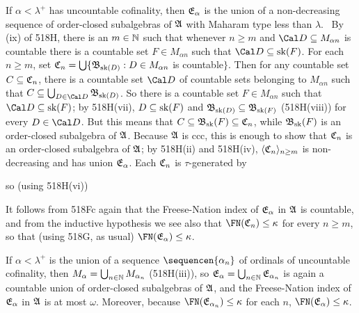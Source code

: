 { If $\alpha<\lambda^+$ has uncountable cofinality, then
$\frak E_{\alpha}$ is the union of a non-decreasing sequence of order-closed
subalgebras of $\frak A$ with Maharam type less than $\lambda$.   \Prf\ By
(ix) of 518H,
there is an $m\in\Bbb N$ such that whenever $n\ge m$ and
$\Cal D\subseteq M_{\alpha n}$ is countable there is a countable set
$F\in M_{\alpha n}$ such that $\Cal D\subseteq\sk(F)$.   For each $n\ge m$,
set
$\frak C_n=\bigcup\{\frak B_{\mathop{\text{sk}}(D)}:D\in M_{\alpha n}$ is countable$\}$.
Then for any countable set $C\subseteq\frak C_n$, there is a countable
set $\Cal D$ of countable sets belonging to $M_{\alpha n}$ such that
$C\subseteq\bigcup_{D\in\Cal D}\frak B_{\sk(D)}$.   So there is a
countable set $F\in M_{\alpha n}$ such that $\Cal D\subseteq\sk(F)$;  by
518H(vii), $D\subseteq\mathop{\text{sk}}(F)$ and
$\frak B_{\mathop{\text{sk}}(D)}\subseteq\frak B_{\mathop{\text{sk}}(F)}$ (518H(viii))
for every $D\in\Cal D$.
But this means that $C\subseteq\frak B_{\mathop{\text{sk}}}(F)\subseteq\frak C_n$,
while $\frak B_{\mathop{\text{sk}}}(F)$ is an order-closed subalgebra of $\frak A$.
Because $\frak A$ is ccc, this is enough to show that $\frak C_n$ is an
order-closed subalgebra of $\frak A$;  by 518H(ii) and 518H(iv),
$\langle\frak C_n\rangle_{n\ge m}$ is non-decreasing and has union
$\frak E_{\alpha}$.   Each $\frak C_n$ is $\tau$-generated by


\noindent so (using 518H(vi))


It follows from 518Fc again that the Freese-Nation index of $\frak E_{\alpha}$ in
$\frak A$ is countable, and from the inductive hypothesis we see also
that $\FN(\frak C_n)\le\kappa$ for every $n\ge m$,
so that (using 518G, as usual) $\FN(\frak E_{\alpha})\le\kappa$.

\medskip

 If $\alpha<\lambda^+$ is the union of a sequence
$\sequencen{\alpha_n}$ of ordinals of uncountable cofinality, then
$M_{\alpha}=\bigcup_{n\in\Bbb N}M_{\alpha_n}$ (518H(iii)), so
$\frak E_{\alpha}=\bigcup_{n\in\Bbb N}\frak E_{\alpha_n}$ is again a countable union
of order-closed subalgebras of $\frak A$, and the Freese-Nation index of
$\frak E_{\alpha}$ in $\frak A$ is at most $\omega$.   Moreover, because
$\FN(\frak E_{\alpha_n})\le\kappa$ for each $n$, $\FN(\frak E_{\alpha})\le\kappa$.

}
